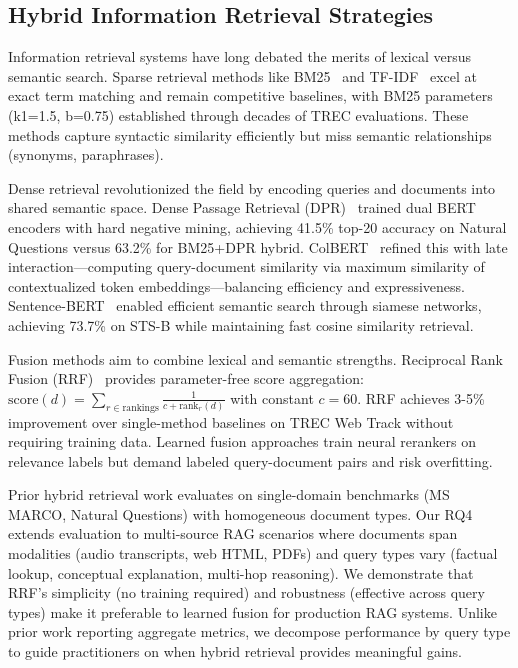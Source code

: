 \documentclass[pdflatex,sn-basic]{sn-jnl}
\begin{document}
\subsection{Hybrid Information Retrieval Strategies}
\label{sec:related-retrieval}

Information retrieval systems have long debated the merits of lexical versus semantic search. Sparse retrieval methods like BM25~\citep{robertson2009bm25} and TF-IDF~\citep{salton1988tfidf} excel at exact term matching and remain competitive baselines, with BM25 parameters (k1=1.5, b=0.75) established through decades of TREC evaluations. These methods capture syntactic similarity efficiently but miss semantic relationships (synonyms, paraphrases).

Dense retrieval revolutionized the field by encoding queries and documents into shared semantic space. Dense Passage Retrieval (DPR)~\citep{karpukhin2020dpr} trained dual BERT encoders with hard negative mining, achieving 41.5\% top-20 accuracy on Natural Questions versus 63.2\% for BM25+DPR hybrid. ColBERT~\citep{khattab2020colbert} refined this with late interaction—computing query-document similarity via maximum similarity of contextualized token embeddings—balancing efficiency and expressiveness. Sentence-BERT~\citep{reimers2019sbert} enabled efficient semantic search through siamese networks, achieving 73.7\% on STS-B while maintaining fast cosine similarity retrieval.

Fusion methods aim to combine lexical and semantic strengths. Reciprocal Rank Fusion (RRF)~\citep{cormack2009rrf} provides parameter-free score aggregation: $\text{score}(d) = \sum_{r \in \text{rankings}} \frac{1}{c + \text{rank}_r(d)}$ with constant $c=60$. RRF achieves 3-5\% improvement over single-method baselines on TREC Web Track without requiring training data. Learned fusion approaches train neural rerankers on relevance labels but demand labeled query-document pairs and risk overfitting.

Prior hybrid retrieval work evaluates on single-domain benchmarks (MS MARCO, Natural Questions) with homogeneous document types. Our RQ4 extends evaluation to multi-source RAG scenarios where documents span modalities (audio transcripts, web HTML, PDFs) and query types vary (factual lookup, conceptual explanation, multi-hop reasoning). We demonstrate that RRF's simplicity (no training required) and robustness (effective across query types) make it preferable to learned fusion for production RAG systems. Unlike prior work reporting aggregate metrics, we decompose performance by query type to guide practitioners on when hybrid retrieval provides meaningful gains.
\end{document}
